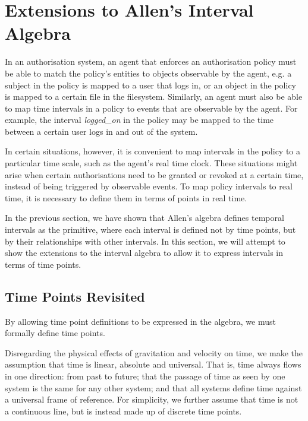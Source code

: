 \documentclass[11pt]{report}
\begin{document}
    \section{Extensions to Allen's Interval Algebra}
      \label{sect-tempo-exten}

      In an authorisation system, an agent that enforces an authorisation
      policy must be able to match the policy's entities to objects observable
      by the agent, e.g. a subject in the policy is mapped to a user that logs
      in, or an object in the policy is mapped to a certain file in the
      filesystem. Similarly, an agent must also be able to map time intervals
      in a policy to events that are observable by the agent. For example,
      the interval {\em logged\_on} in the policy may be mapped to the time
      between a certain user logs in and out of the system.

      In certain situations, however, it is convenient to map intervals in the
      policy to a particular time scale, such as the agent's real time clock.
      These situations might arise when certain authorisations need to be
      granted or revoked at a certain time, instead of being triggered by
      observable events. To map policy intervals to real time, it is necessary
      to define them in terms of points in real time.

      In the previous section, we have shown that Allen's algebra defines
      temporal intervals as the primitive, where each interval is defined not
      by time points, but by their relationships with other intervals. In this
      section, we will attempt to show the extensions to the interval algebra
      to allow it to express intervals in terms of time points.

      \subsection{Time Points Revisited}
        \label{subs-tempo-tprev}

        By allowing time point definitions to be expressed in the algebra, we
        must formally define time points.

        Disregarding the physical effects of gravitation and velocity on time,
        we make the assumption that time is linear, absolute and universal.
        That is, time always flows in one direction: from past to future; that
        the passage of time as seen by one system is the same for any other
        system; and that all systems define time against a universal frame of
        reference. For simplicity, we further assume that time is not a
        continuous line, but is instead made up of discrete time points.
\end{document}
